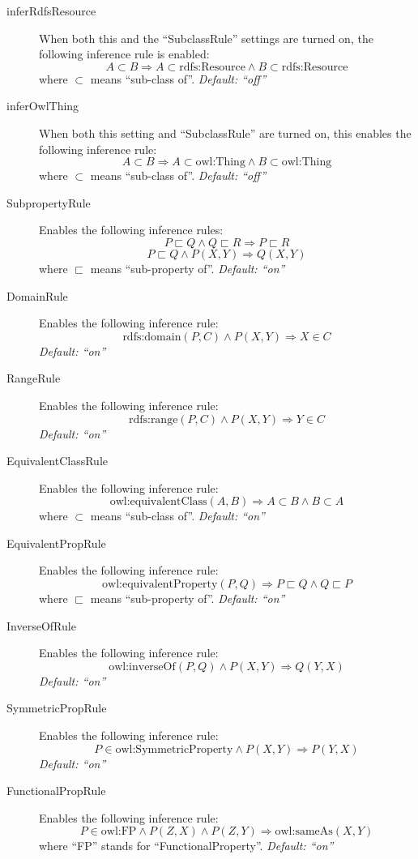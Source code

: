 \begin{description}
	\item[inferRdfsResource] When both this and the ``SubclassRule'' settings are turned on, the following inference rule is enabled:
\[A \subset B \Rightarrow A \subset \text{rdfs:Resource} \land B \subset \text{rdfs:Resource}\]
where $\subset$ means ``sub-class of''. \emph{Default: ``off''}

	\item[inferOwlThing] When both this setting and ``SubclassRule'' are turned on, this enables the following inference rule:
\[A \subset B \Rightarrow A \subset \text{owl:Thing} \land B \subset \text{owl:Thing}\]
where $\subset$ means ``sub-class of''. \emph{Default: ``off''}

	\item[SubpropertyRule] Enables the following inference rules:
\[P \sqsubset Q \land Q \sqsubset R \Rightarrow P \sqsubset R\]
\[P \sqsubset Q \land P(X, Y) \Rightarrow Q(X, Y)\]
where $\sqsubset$ means ``sub-property of''. \emph{Default: ``on''}

	\item[DomainRule] Enables the following inference rule:
\[\text{rdfs:domain}(P,C) \land P(X, Y) \Rightarrow X \in C\]
\emph{Default: ``on''}

	\item[RangeRule] Enables the following inference rule:
\[\text{rdfs:range}(P,C) \land P(X, Y) \Rightarrow Y \in C\]
\emph{Default: ``on''}

	\item[EquivalentClassRule] Enables the following inference rule:
\[\text{owl:equivalentClass}(A,B) \Rightarrow A \subset B \land B \subset A\]
where $\subset$ means ``sub-class of''. \emph{Default: ``on''}

	\item[EquivalentPropRule] Enables the following inference rule:
\[\text{owl:equivalentProperty}(P,Q) \Rightarrow P \sqsubset Q \land Q \sqsubset P\]
where $\sqsubset$ means ``sub-property of''. \emph{Default: ``on''}

	\item[InverseOfRule] Enables the following inference rule:
\[\text{owl:inverseOf}(P, Q) \land P(X, Y) \Rightarrow Q(Y, X)\]
\emph{Default: ``on''}

	\item[SymmetricPropRule] Enables the following inference rule:
\[P \in \text{owl:SymmetricProperty} \land P(X, Y) \Rightarrow P(Y, X)\]
\emph{Default: ``on''}

	\item[FunctionalPropRule] Enables the following inference rule:
\[P \in \text{owl:FP} \land P(Z, X) \land P(Z, Y) \Rightarrow \text{owl:sameAs}(X, Y)\]
where ``FP'' stands for ``FunctionalProperty''. \emph{Default: ``on''}


\end{description}
